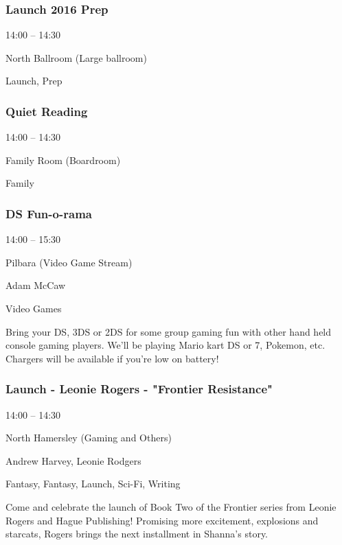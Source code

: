\documentclass{scrreprt}
\begin{document}
\begin{multicols}{2}
\subsubsection*{Launch 2016 Prep}\begin{description}
\setlength{\itemsep}{0pt}
\setlength{\parsep}{0pt}
\setlength{\parskip}{0pt}
\item[Time:]{14:00 -- 14:30}
\item[Venue:]{North Ballroom (Large ballroom)}
\item[Tags:]{Launch, Prep}\end{description}

\subsubsection*{Quiet Reading}\begin{description}
\setlength{\itemsep}{0pt}
\setlength{\parsep}{0pt}
\setlength{\parskip}{0pt}
\item[Time:]{14:00 -- 14:30}
\item[Venue:]{Family Room (Boardroom)}
\item[Tags:]{Family}\end{description}

\subsubsection*{DS Fun-o-rama}\begin{description}
\setlength{\itemsep}{0pt}
\setlength{\parsep}{0pt}
\setlength{\parskip}{0pt}
\item[Time:]{14:00 -- 15:30}
\item[Venue:]{Pilbara (Video Game Stream)}
\item[People:]{Adam McCaw}
\item[Tags:]{Video Games}\end{description}
Bring your DS, 3DS or 2DS for some group gaming fun with other hand held console gaming players. We'll be playing Mario kart DS or 7, Pokemon, etc. Chargers will be available if you're low on battery!
\subsubsection*{Launch - Leonie Rogers - "Frontier Resistance"}\begin{description}
\setlength{\itemsep}{0pt}
\setlength{\parsep}{0pt}
\setlength{\parskip}{0pt}
\item[Time:]{14:00 -- 14:30}
\item[Venue:]{North Hamersley (Gaming and Others)}
\item[People:]{Andrew Harvey, Leonie Rodgers}
\item[Tags:]{Fantasy, Fantasy, Launch, Sci-Fi, Writing}\end{description}
Come and celebrate the launch of Book Two of the Frontier series from Leonie Rogers and Hague Publishing! Promising more excitement, explosions and starcats, Rogers brings the next installment in Shanna's story.

\end{multicols}
\end{document}
